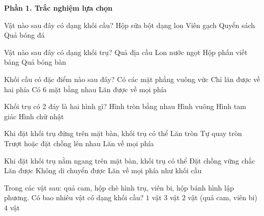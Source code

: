 \textbf{Phần 1. Trắc nghiệm lựa chọn}

\begin{ex} %
Vật nào sau đây có dạng khối cầu?
\choice
{Hộp sữa bột dạng lon}
{Viên gạch}
{Quyển sách}
{\True Quả bóng đá}
\end{ex}

\begin{ex} %
Vật nào sau đây có dạng khối trụ?
\choice
{Quả địa cầu}
{\True Lon nước ngọt}
{Hộp phấn viết bảng}
{Quả bóng bàn}
\end{ex}

\begin{ex} %
Khối cầu có đặc điểm nào sau đây?
\choice
{Có các mặt phẳng vuông vức}
{Chỉ lăn được về hai phía}
{Có 6 mặt bằng nhau}
{\True Lăn được về mọi phía}
\end{ex}

\begin{ex} %
Khối trụ có 2 đáy là hai hình gì?
\choice
{\True Hình tròn bằng nhau}
{Hình vuông}
{Hình tam giác}
{Hình chữ nhật}
\end{ex}

\begin{ex} %
Khi đặt khối trụ đứng trên mặt bàn, khối trụ có thể
\choice
{Lăn tròn}
{Tự quay tròn}
{\True Trượt hoặc đặt chồng lên nhau}
{Lăn về mọi phía}
\end{ex}

\begin{ex} %
Khi đặt khối trụ nằm ngang trên mặt bàn, khối trụ có thể
\choice
{Đặt chồng vững chắc}
{\True Lăn được}
{Không di chuyển được}
{Lăn về mọi phía như khối cầu}
\end{ex}

\begin{ex} %
Trong các vật sau: quả cam, hộp chè hình trụ, viên bi, hộp bánh hình lập phương. Có bao nhiêu vật có dạng khối cầu?
\choice
{$1$ vật}
{$3$ vật}
{\True $2$ vật (quả cam, viên bi)}
{$4$ vật}
\end{ex}

